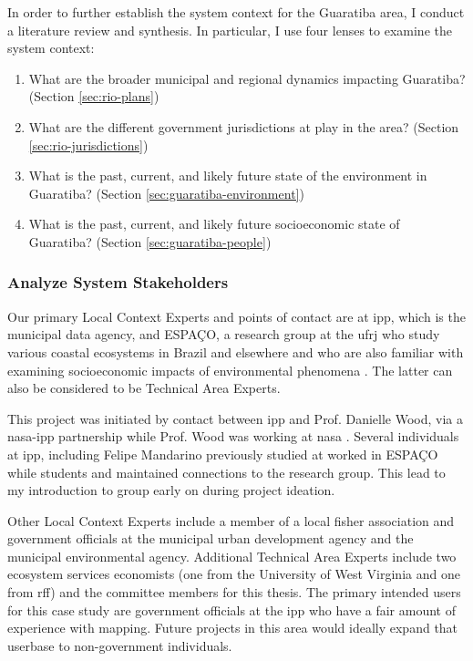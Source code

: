 In order to further establish the system context for the Guaratiba area, I conduct a literature review and synthesis. In particular, I use four lenses to examine the system context:

\begin{enumerate} \setlength{\itemsep}{0pt} \setlength{\parskip}{0pt}
    \item What are the broader municipal and regional dynamics impacting Guaratiba? (Section \ref{sec:rio-plans})
    \item What are the different government jurisdictions at play in the area? (Section \ref{sec:rio-jurisdictions})
    \item What is the past, current, and likely future state of the environment in Guaratiba? (Section \ref{sec:guaratiba-environment})
    \item What is the past, current, and likely future socioeconomic state of Guaratiba? (Section \ref{sec:guaratiba-people})
\end{enumerate}

\subsubsection{Analyze System Stakeholders}

Our primary Local Context Experts and points of contact are at \ac{ipp}, which is the municipal data agency, and ESPAÇO, a research group at the \ac{ufrj} who study various coastal ecosystems in Brazil and elsewhere \cite{cruzClassificacaoOrientadaObjetos2007, seabraMapeamentoDinamicaCobertura2013} and who are also familiar with examining socioeconomic impacts of environmental phenomena \cite{schwenkResearchEnvironmentalSocioeconomical2008}. The latter can also be considered to be Technical Area Experts.

This project was initiated by contact between \ac{ipp} and Prof. Danielle Wood, via a \ac{nasa}-\ac{ipp} partnership while Prof. Wood was working at \ac{nasa} \cite{mandarinoNASARioJaneiroPartnership2018}. Several individuals at \ac{ipp}, including Felipe Mandarino previously studied at worked in ESPAÇO while students and maintained connections to the research group. This lead to my introduction to group early on during project ideation.

Other Local Context Experts include a member of a local fisher association and government officials at the municipal urban development agency and the municipal environmental agency. Additional Technical Area Experts include two ecosystem services economists (one from the University of West Virginia and one from \ac{rff}) and the committee members for this thesis. The primary intended users for this case study are government officials at the \ac{ipp} who have a fair amount of experience with mapping. Future projects in this area would ideally expand that userbase to non-government individuals. 

